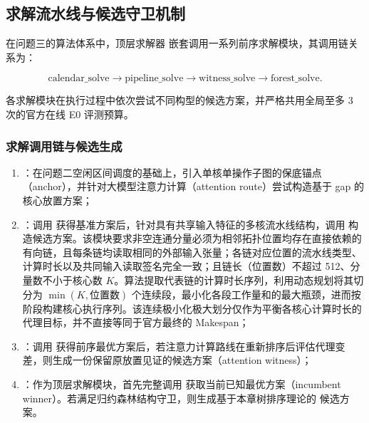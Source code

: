 \documentclass[anonymous,withtoc]{gmcm2026}
\providecommand{\tightlist}{\setlength{\itemsep}{0pt}\setlength{\parskip}{0pt}}
\begin{document}
\subsection{求解流水线与候选守卫机制}

在问题三的算法体系中，顶层求解器 \texttt{} 嵌套调用一系列前序求解模块，其调用链关系为：

\begin{equation}
\text{calendar\_solve} \longrightarrow \text{pipeline\_solve} \longrightarrow \text{witness\_solve} \longrightarrow \text{forest\_solve}.
\end{equation}

各求解模块在执行过程中依次尝试不同构型的候选方案，并严格共用全局至多 3 次的官方在线 E0 评测预算。

\subsubsection{求解调用链与候选生成}

\begin{enumerate}
\def\labelenumi{\arabic{enumi}.}
\tightlist
\item
  \textbf{\texttt{}}：在问题二空闲区间调度的基础上，引入单核单操作子图的保底锚点（anchor），并针对大模型注意力计算（attention route）尝试构造基于 gap 的核心放置方案；
\item
  \textbf{\texttt{}}：调用 \texttt{} 获得基准方案后，针对具有共享输入特征的多核流水线结构，调用 \texttt{} 构造候选方案。该模块要求非空连通分量必须为相邻拓扑位置均存在直接依赖的有向链，且每条链均读取相同的外部输入张量；各链对应位置的流水线类型、计算时长以及共同输入读取签名完全一致；且链长（位置数）不超过 512、分量数不小于核心数 \(K\)。算法提取代表链的计算时长序列，利用动态规划将其切分为 \(\min(K, \text{位置数})\) 个连续段，最小化各段工作量和的最大瓶颈，进而按阶段构建核心执行序列。该连续极小化极大划分仅作为平衡各核心计算时长的代理目标，并不直接等同于官方最终的 Makespan；
\item
  \textbf{\texttt{}}：调用 \texttt{} 获得前序最优方案后，若注意力计算路线在重新排序后评估代理变差，则生成一份保留原放置见证的候选方案（attention witness）；
\item
  \textbf{\texttt{}}：作为顶层求解模块，首先完整调用 \texttt{} 获取当前已知最优方案（incumbent winner）。若满足归约森林结构守卫，则生成基于本章树排序理论的 \texttt{} 候选方案。
\end{enumerate}
\end{document}
